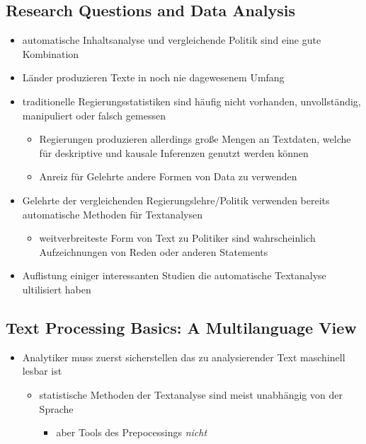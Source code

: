 \documentclass[11pt]{article}
\begin{document}
\subsection{Research Questions and Data Analysis}
\label{sec:org6c3b24c}
\begin{itemize}
\item automatische Inhaltsanalyse und vergleichende Politik sind eine gute Kombination
\item Länder produzieren Texte in noch nie dagewesenem Umfang
\item traditionelle Regierungsstatistiken sind häufig nicht vorhanden, unvollständig, manipuliert oder falsch gemessen 
\begin{itemize}
\item Regierungen produzieren allerdings große Mengen an Textdaten, welche für deskriptive und kausale Inferenzen genutzt werden können
\item Anreiz für Gelehrte andere Formen von Data zu verwenden
\end{itemize}
\item Gelehrte der vergleichenden Regierungslehre/Politik verwenden bereits automatische Methoden für Textanalysen
\begin{itemize}
\item weitverbreiteste Form von Text zu Politiker sind wahrscheinlich Aufzeichnungen von Reden oder anderen Statements
\end{itemize}
\item Auflistung einiger interessanten Studien die automatische Textanalyse ultilisiert haben
\end{itemize}
\subsection{Text Processing Basics: A Multilanguage View}
\label{sec:org99f934c}
\begin{itemize}
\item Analytiker muss zuerst sicherstellen das zu analysierender Text maschinell lesbar ist
\begin{itemize}
\item statistische Methoden der Textanalyse sind meist unabhängig von der Sprache
\begin{itemize}
\item aber Tools des Prepocessings \emph{nicht}
\end{itemize}
\end{itemize}
\end{itemize}
\end{document}
